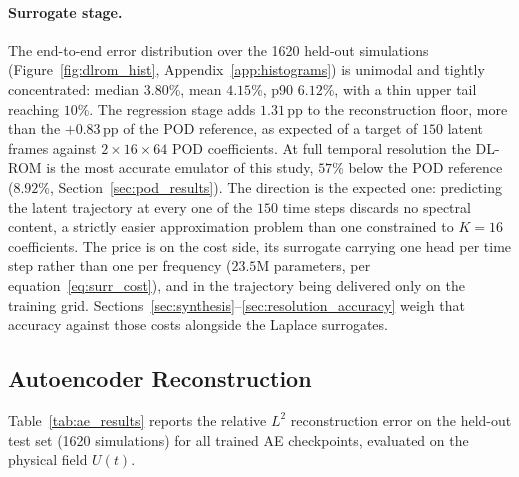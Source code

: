 ﻿\documentclass[a4paper,12pt]{article}
\theoremstyle{definition}
\theoremstyle{remark}
\begin{document}
\paragraph{Surrogate stage.} The end-to-end error distribution over the 1620 held-out simulations (Figure~\ref{fig:dlrom_hist}, Appendix~\ref{app:histograms}) is unimodal and tightly concentrated: median $3.80$\%, mean $4.15$\%, p90 $6.12$\%, with a thin upper tail reaching $10$\%. The regression stage adds $1.31$\,pp to the reconstruction floor, more than the $+0.83$\,pp of the POD reference, as expected of a target of $150$ latent frames against $2 \times 16 \times 64$ POD coefficients. At full temporal resolution the DL-ROM is the most accurate emulator of this study, $57$\% below the POD reference ($8.92$\%, Section~\ref{sec:pod_results}). The direction is the expected one: predicting the latent trajectory at every one of the $150$ time steps discards no spectral content, a strictly easier approximation problem than one constrained to $K = 16$ coefficients. The price is on the cost side, its surrogate carrying one head per time step rather than one per frequency ($23.5$M parameters, per equation~\eqref{eq:surr_cost}), and in the trajectory being delivered only on the training grid. Sections~\ref{sec:synthesis}--\ref{sec:resolution_accuracy} weigh that accuracy against those costs alongside the Laplace surrogates.

\subsection{Autoencoder Reconstruction}
\label{sec:ae_perf}

Table~\ref{tab:ae_results} reports the relative $L^2$ reconstruction error on the held-out test set (1620 simulations) for all trained AE checkpoints, evaluated on the physical field $U(t)$.
\end{document}
